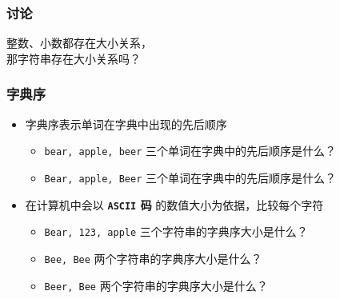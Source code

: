 \begin{frame}[fragile]
    \frametitle{讨论}

    \begin{block}{}
        \vspace{.5cm}
        \begin{center}
            {\Large 整数、小数都存在大小关系，\\那字符串存在大小关系吗？}
        \end{center}
        \vspace{.5cm}
    \end{block}
\end{frame}

\begin{frame}[fragile]
    \frametitle{字典序}

    \begin{itemize}[<+->]
        \item 字典序表示单词在字典中出现的先后顺序
        \begin{itemize}
            \item \lstinline|bear, apple, beer| 三个单词在字典中的先后顺序是什么？
            \item \lstinline|Bear, apple, Beer| 三个单词在字典中的先后顺序是什么？
        \end{itemize}
        \item 在计算机中会以 \textbf{\lstinline|ASCII| 码} 的数值大小为依据，比较每个字符
        \begin{itemize}
            \item \lstinline|Bear, 123, apple| 三个字符串的字典序大小是什么？
            \item \lstinline|Bee, Bee| 两个字符串的字典序大小是什么？
            \item \lstinline|Beer, Bee| 两个字符串的字典序大小是什么？
        \end{itemize}
    \end{itemize}

\end{frame}

